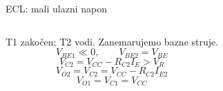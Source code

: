 \begin{frame}[label=10-s083]{ECL: mali ulazni napon}
\setlength{\abovedisplayskip}{4pt}\setlength{\belowdisplayskip}{4pt}\setlength{\abovedisplayshortskip}{3pt}\setlength{\belowdisplayshortskip}{3pt}
\begin{columns}[T,onlytextwidth]\centering \raggedright T1 zakočen; T2 vodi. Zanemarujemo bazne struje.
\[V_{BE1}\ll0,\qquad V_{BE2}=V_{BE}\]
\[V_{C2}=V_{CC}-R_{C2}I_E>V_R\]
\[V_{O2}=V_{C2}=V_{CC}-R_{C2}I_{E2}\]
\[V_{O1}=V_{C1}=V_{CC}\]
\medskip{}\end{columns}
\end{frame}
